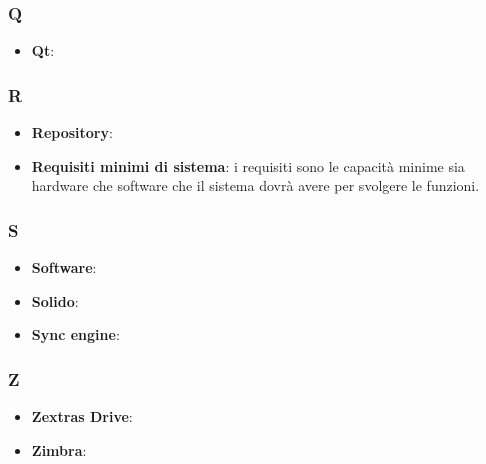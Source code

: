 \subsubsection{Q}
\begin{itemize}
\item \textbf{Qt}:
\end{itemize}

\subsubsection{R}
\begin{itemize}
	\item \textbf{Repository}:
	\item \textbf{Requisiti minimi di sistema}: i requisiti sono le capacità minime sia hardware che software che il sistema dovrà avere per svolgere le funzioni.
\end{itemize}

\subsubsection{S}
\begin{itemize}
	\item \textbf{Software}:
	\item \textbf{Solido}:
	\item \textbf{Sync engine}:
\end{itemize}

\subsubsection{Z}
\begin{itemize}
	\item \textbf{Zextras Drive}:
	\item \textbf{Zimbra}:
\end{itemize}